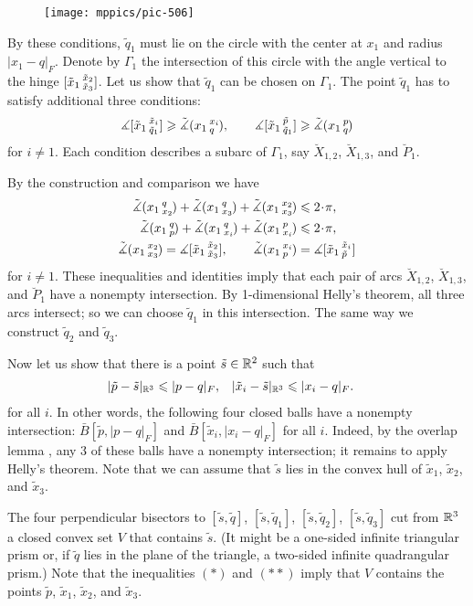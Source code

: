 \documentclass{article}
\begin{document}
\begin{wrapfigure}{r}{30mm}
\vskip-0mm
\centering
\texttt{[image: mppics/pic-506]}
\end{wrapfigure}

By these conditions, $\tilde q_1$ must lie on the circle with the center at $x_1$ and radius $|x_1-q|_F$.
Denote by $\Gamma_1$ the intersection of this circle with the angle vertical to the hinge $[\tilde x_1\,{}^{\tilde x_2}_{\tilde x_3}]$.
Let us show that $\tilde q_1$ can be chosen on $\Gamma_1$.
The point $\tilde q_1$ has to satisfy additional three conditions:
\[\measuredangle[\tilde x_1\,{}^{\tilde x_i}_{\tilde q_1}]\geqslant \tilde\measuredangle(x_1\,{}^{x_i}_{q}\hspace{-0.2ex}),
\qquad
\measuredangle[\tilde x_1\,{}^{\tilde p}_{\tilde q_1}]\geqslant \tilde\measuredangle(x_1\,{}^{p}_{q}\hspace{-0.2ex})\]
for $i\ne 1$.
Each condition describes a subarc of $\Gamma_1$, say $\breve{X}_{1,2}$, $\breve{X}_{1,3}$, and $\breve{P}_{1}$.

By the construction and comparison we have 
\begin{align*}
\angk{x_1}{q}{x_2}+\angk{x_1}{q}{x_3}+\angk{x_1}{x_2}{x_3}&\le 2\cdot\pi,
\\
\angk{x_1}{q}{p}+\angk{x_1}{q}{x_i}+\angk{x_1}{p}{x_i}&\le 2\cdot\pi,
\\
\angk{x_1}{x_2}{x_3}=\measuredangle\hinge{\tilde x_1}{\tilde x_2}{\tilde x_3},
\qquad
\angk{x_1}{x_i}{p}&=\measuredangle\hinge{\tilde x_1}{\tilde x_i}{\tilde p}
\end{align*}
for $i\ne 1$.
These inequalities and identities imply that each pair of arcs $\breve{X}_{1,2}$, $\breve{X}_{1,3}$, and $\breve{P}_{1}$ have a nonempty intersection.
By 1-dimensional Helly's theorem, all three arcs intersect;
so we can choose $\tilde q_1$ in this intersection.
The same way we construct $\tilde q_2$ and $\tilde q_3$.

Now let us show that there is a point $\tilde s\in\mathbb{R}^2$ such that
\begin{align*}
|\tilde p-\tilde s|_{\mathbb{R}^3}&\leqslant|p-q|_F,
&
|\tilde x_i-\tilde s|_{\mathbb{R}^3}&\leqslant|x_i-q|_F.
\end{align*}
for all $i$.
In other words, the following four closed balls have a nonempty intersection: 
$\bar B[\tilde p,|p-q|_F]$ and
$\bar B[\tilde x_i,|x_i-q|_F]$ for all $i$.
Indeed, by the overlap lemma \cite{alexander2019alexandrov}, any 3 of these balls have a nonempty intersection;
it remains to apply Helly's theorem.
Note that we can assume that $\tilde s$ lies in the convex hull of $\tilde x_1$, $\tilde x_2$, and $\tilde x_3$.

The four perpendicular bisectors to 
$[\tilde s, \tilde q]$, 
$[\tilde s, \tilde q_1]$, 
$[\tilde s, \tilde q_2]$, 
$[\tilde s, \tilde q_3]$ cut from $\mathbb{R}^3$ a closed convex set $V$ that contains $\tilde s$.
(It might be a one-sided infinite triangular prism or, if $\tilde q$ lies in the plane of the triangle, a two-sided infinite quadrangular prism.)
Note that the inequalities $({*})$ and $({*}{*})$ imply that $V$ contains the points $\tilde p$, $\tilde x_1$, $\tilde x_2$, and $\tilde x_3$.
\end{document}
